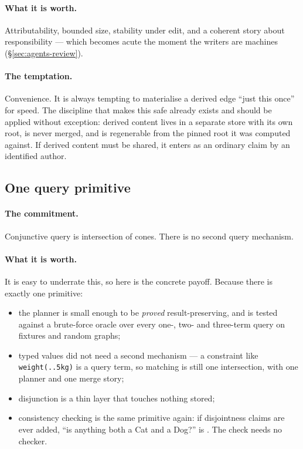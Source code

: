 \paragraph{What it is worth.} Attributability, bounded size, stability under
edit, and a coherent story about responsibility --- which becomes acute the
moment the writers are machines (\S\ref{sec:agents-review}).

\paragraph{The temptation.} Convenience. It is always tempting to materialise
a derived edge ``just this once'' for speed. The discipline that makes this
safe already exists and should be applied without exception: derived content
lives in a separate store with its own root, is never merged, and is
regenerable from the pinned root it was computed against. If derived content
must be shared, it enters as an ordinary claim by an identified author.

\subsection{One query primitive}

\paragraph{The commitment.} Conjunctive query is intersection of cones. There
is no second query mechanism.

\paragraph{What it is worth.} It is easy to underrate this, so here is the
concrete payoff. Because there is exactly one primitive:

\begin{itemize}[leftmargin=1.4em]
\item the planner is small enough to be \emph{proved} result-preserving, and
  is tested against a brute-force oracle over every one-, two- and three-term
  query on fixtures and random graphs;
\item typed values did not need a second mechanism --- a constraint like
  \verb|weight(..5kg)| is a query term, so matching is still one intersection,
  with one planner and one merge story;
\item disjunction is a thin layer that touches nothing stored;
\item consistency checking is the same primitive again: if disjointness
  claims are ever added, ``is anything both a Cat and a Dog?'' is
  . The check needs no checker.
\end{itemize}

